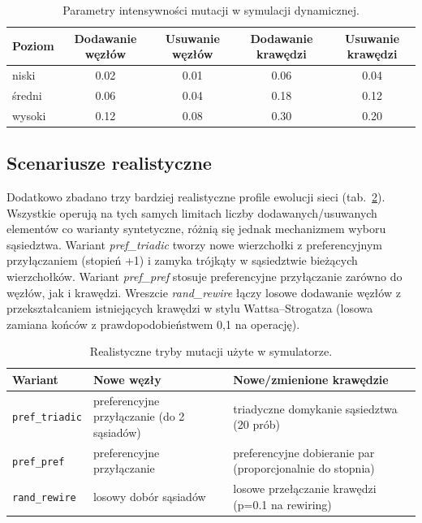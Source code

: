 \begin{table}[H]
  \centering
  \caption{Parametry intensywności mutacji w symulacji dynamicznej.}
  \label{tab:dyn-mutation-levels}
  \begin{tabular}{lcccc}
    \toprule
    \textbf{Poziom} & \textbf{Dodawanie węzłów} & \textbf{Usuwanie węzłów} & \textbf{Dodawanie krawędzi} & \textbf{Usuwanie krawędzi} \\
    \midrule
    niski           & 0.02                      & 0.01                     & 0.06                        & 0.04                       \\
    średni          & 0.06                      & 0.04                     & 0.18                        & 0.12                       \\
    wysoki          & 0.12                      & 0.08                     & 0.30                        & 0.20                       \\
  \end{tabular}
\end{table}

\subsection{Scenariusze realistyczne}

Dodatkowo zbadano trzy bardziej realistyczne profile ewolucji sieci (tab.~\ref{tab:dyn-realistic-modes}). Wszystkie operują na tych samych limitach liczby dodawanych/usuwanych elementów co warianty syntetyczne, różnią się jednak mechanizmem wyboru sąsiedztwa. Wariant \emph{pref\_triadic} tworzy nowe wierzchołki z preferencyjnym przyłączaniem (stopień +1) i zamyka trójkąty w sąsiedztwie bieżących wierzchołków. Wariant \emph{pref\_pref} stosuje preferencyjne przyłączanie zarówno do węzłów, jak i krawędzi. Wreszcie \emph{rand\_rewire} łączy losowe dodawanie węzłów z przekształcaniem istniejących krawędzi w stylu Wattsa--Strogatza (losowa zamiana końców z prawdopodobieństwem 0,1 na operację).

\begin{table}[H]
  \centering
  \caption{Realistyczne tryby mutacji użyte w symulatorze.}
  \label{tab:dyn-realistic-modes}
  \begin{tabular}{lll}
    \toprule
    \textbf{Wariant}       & \textbf{Nowe węzły}                        & \textbf{Nowe/zmienione krawędzie}                         \\
    \midrule
    \texttt{pref\_triadic} & preferencyjne przyłączanie (do 2 sąsiadów) & triadyczne domykanie sąsiedztwa (20 prób)                 \\
    \texttt{pref\_pref}    & preferencyjne przyłączanie                 & preferencyjne dobieranie par (proporcjonalnie do stopnia) \\
    \texttt{rand\_rewire}  & losowy dobór sąsiadów                      & losowe przełączanie krawędzi (p=0.1 na rewiring)          \\
  \end{tabular}
\end{table}

